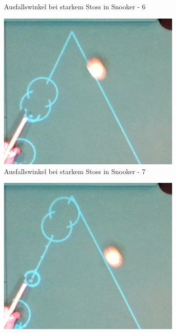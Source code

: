 \begin{figure}[h!]
\begin{subfigure}[b]{0.2\textwidth}
        \caption{Ausfallswinkel bei starkem Stoss in Snooker - 6}
        \label{fig:rebound_angle_fast_snooker_6}
    \end{subfigure}
    \hfill
    \begin{subfigure}[b]{0.2\textwidth}
        \centering
        \includegraphics[width=1.0\linewidth]{../common/04_results/resources/simulation/rebound_angle_fast_snooker/00_rail_rebound_angle_fast_snooker_07.png}
        \caption{Ausfallswinkel bei starkem Stoss in Snooker - 7}
        \label{fig:rebound_angle_fast_snooker_7}
    \end{subfigure}
    \hfill
    \begin{subfigure}[b]{0.2\textwidth}
        \centering
        \includegraphics[width=1.0\linewidth]{../common/04_results/resources/simulation/rebound_angle_fast_snooker/00_rail_rebound_angle_fast_snooker_08.png}

\end{subfigure}
\end{figure}

